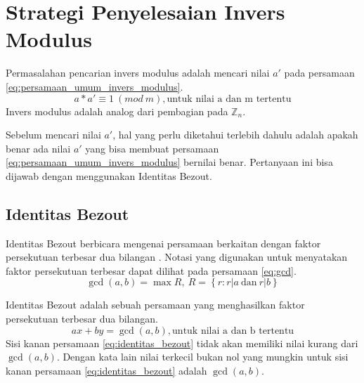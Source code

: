 \section{ Strategi Penyelesaian Invers Modulus}

Permasalahan pencarian invers modulus adalah mencari nilai $ a' $ pada persamaan \eqref{eq:persamaan_umum_invers_modulus}.
\begin{equation}
a * a' \equiv 1\ (mod\ m), \text{untuk nilai a dan m tertentu}
\label{eq:persamaan_umum_invers_modulus}
\end{equation}
Invers modulus adalah analog dari pembagian pada $ \mathbb{Z}_n $.

Sebelum mencari nilai $ a' $, hal yang perlu diketahui terlebih dahulu adalah apakah benar ada nilai $ a' $ yang bisa membuat persamaan \eqref{eq:persamaan_umum_invers_modulus} bernilai benar. Pertanyaan ini bisa dijawab dengan menggunakan Identitas Bezout.

\subsection{ Identitas Bezout}

Identitas Bezout berbicara mengenai persamaan berkaitan dengan faktor persekutuan terbesar dua bilangan \cite{brilliant_bezout}. Notasi yang digunakan untuk menyatakan faktor persekutuan terbesar dapat dilihat pada persamaan \eqref{eq:gcd}.
\begin{equation}
\gcd⁡(a,b)=\max R,\ R=\left\{r:r|a\ \text{dan} \ r|b\right\}
\label{eq:gcd}
\end{equation}

Identitas Bezout adalah sebuah persamaan yang menghasilkan faktor persekutuan terbesar dua bilangan.
\begin{equation}
ax+by=\gcd(a,b), \text{untuk nilai a dan b tertentu}
\label{eq:identitas_bezout}
\end{equation}
Sisi kanan persamaan \eqref{eq:identitas_bezout} tidak akan memiliki nilai kurang dari $ \gcd (a,b) $. Dengan kata lain nilai terkecil bukan nol yang mungkin untuk sisi kanan persamaan \eqref{eq:identitas_bezout} adalah $ \gcd (a,b) $.

